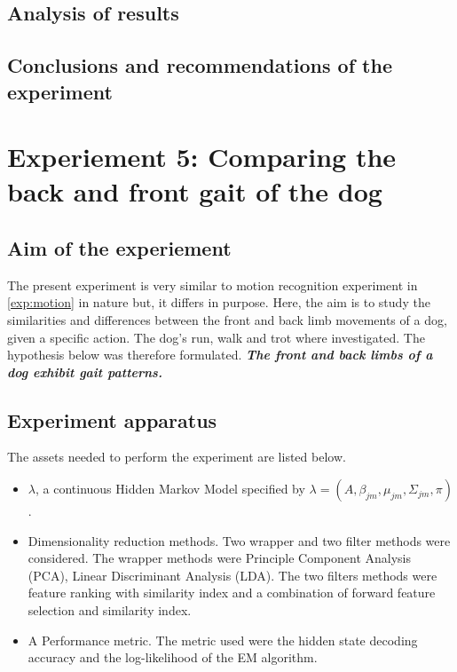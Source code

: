 \subsection{Analysis of results}

\subsection{Conclusions and recommendations of the experiment}


\section{Experiement 5: Comparing the back and front gait of the dog}  \label{exp:front-back}

\subsection{Aim of the experiement}
The present experiment is very similar to motion recognition experiment in \ref{exp:motion} in nature but, it differs in purpose. Here, the aim is to study the similarities and differences between the front and back limb movements of a dog, given a specific action. The dog's run, walk and trot where investigated.
The hypothesis below was therefore formulated.
\textbf{\textit{The front and back limbs of a dog exhibit gait patterns.}}

\subsection{Experiment apparatus}
The assets needed to perform the experiment are listed below.
\begin{itemize}
	\item \(\lambda\), a continuous Hidden Markov Model specified by \(\lambda = (A, \beta_{jm}, \mu_{jm}, \Sigma_{jm}, \pi)\).
	\item Dimensionality reduction methods. Two wrapper and two filter methods were considered. The wrapper methods were Principle Component Analysis (PCA), Linear Discriminant Analysis (LDA). The two filters methods were feature ranking with similarity index %
	and a combination of forward feature selection and similarity index.
	\item A Performance metric. The metric used were the hidden state decoding accuracy and the log-likelihood of the EM algorithm.
\end{itemize}

